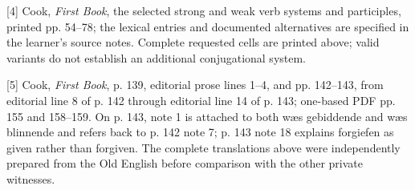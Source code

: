[4] Cook, \emph{First Book}, the selected strong and weak verb systems and participles, printed pp. 54–78; the lexical entries and documented alternatives are specified in the learner's source notes. Complete requested cells are printed above; valid variants do not establish an additional conjugational system.

[5] Cook, \emph{First Book}, p. 139, editorial prose lines 1–4, and pp. 142–143, from editorial line 8 of p. 142 through editorial line 14 of p. 143; one-based PDF pp. 155 and 158–159. On p. 143, note 1 is attached to both wæs gebiddende and wæs blinnende and refers back to p. 142 note 7; p. 143 note 18 explains forgiefen as given rather than forgiven. The complete translations above were independently prepared from the Old English before comparison with the other private witnesses.

\endgroup

\par\label{end-ch11-key}
\clearpage\endgroup
